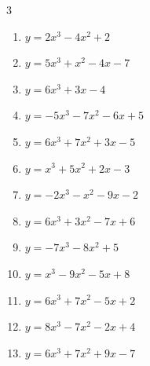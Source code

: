 \begin{multicols}{3}
\begin{enumerate}
  \item $y=2x^{3}-4x^{2}+2$


  \item $y=5x^{3}+x^{2}-4x-7$


  \item $y=6x^{3}+3x-4$


  \item $y=-5x^{3}-7x^{2}-6x+5$


  \item $y=6x^{3}+7x^{2}+3x-5$


  \item $y=x^{3}+5x^{2}+2x-3$


  \item $y=-2x^{3}-x^{2}-9x-2$


  \item $y=6x^{3}+3x^{2}-7x+6$


\columnbreak %

  \item $y=-7x^{3}-8x^{2}+5$


  \item $y=x^{3}-9x^{2}-5x+8$


  \item $y=6x^{3}+7x^{2}-5x+2$


  \item $y=8x^{3}-7x^{2}-2x+4$


  \item $y=6x^{3}+7x^{2}+9x-7$


\end{enumerate}
\end{multicols}
